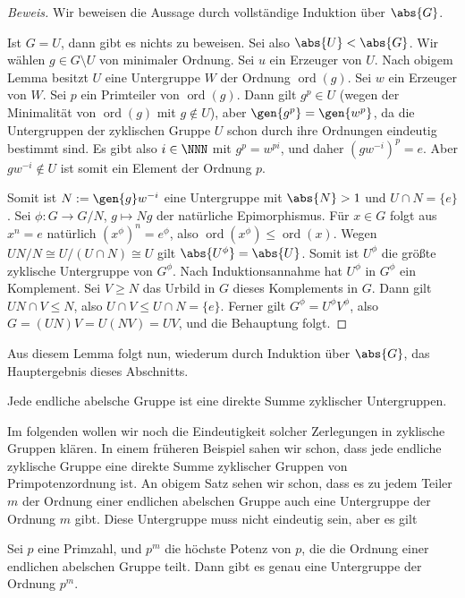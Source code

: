 \documentclass[12pt,a4paper,twoside]{article}
\DeclareMathOperator{\ord}{ord}
\begin{document}
\begin{proof}[Beweis]
  Wir beweisen die Aussage durch vollst\"andige Induktion \"uber $\abs{G}$.
  
  Ist $G=U$, dann gibt es nichts zu beweisen. Sei also $\abs{U}<\abs{G}$. Wir
  w\"ahlen $g\in G\setminus U$ von minimaler Ordnung. Sei $u$ ein Erzeuger von
  $U$. Nach obigem Lemma besitzt $U$ eine Untergruppe $W$ der Ordnung
  $\ord(g)$. Sei $w$ ein Erzeuger von $W$. Sei $p$ ein Primteiler von
  $\ord(g)$. Dann gilt $g^p\in U$ (wegen der Minimalit\"at von $\ord(g)$ mit
  $g\notin U$), aber $\gen{g^p}=\gen{w^p}$, da die Untergruppen der zyklischen
  Gruppe $U$ schon durch ihre Ordnungen eindeutig bestimmt sind. Es gibt also
  $i\in\NNN$ mit $g^p=w^{pi}$, und daher $(gw^{-i})^p=e$. Aber $gw^{-i}\notin
  U$ ist somit ein Element der Ordnung $p$.
  
  Somit ist $N:=\gen{g}w^{-i}$ eine Untergruppe mit $\abs{N}>1$ und $U\cap
  N=\{e\}$.  Sei $\phi:G\to G/N$, $g\mapsto Ng$ der nat\"urliche
  Epimorphismus. F\"ur $x\in G$ folgt aus $x^n=e$ nat\"urlich
  $(x^\phi)^n=e^\phi$, also $\ord(x^\phi)\le\ord(x)$. Wegen $UN/N\cong
  U/(U\cap N)\cong U$ gilt $\abs{U^\phi}=\abs{U}$. Somit ist $U^\phi$ die
  gr\"o\ss te zyklische Untergruppe von $G^\phi$. Nach Induktionsannahme hat
  $U^\phi$ in $G^\phi$ ein Komplement. Sei $V\ge N$ das Urbild in $G$ dieses
  Komplements in $G$.  Dann gilt $UN\cap V\le N$, also $U\cap V\le U\cap
  N=\{e\}$. Ferner gilt $G^\phi=U^\phi V^\phi$, also $G=(UN)V=U(NV)=UV$, und
  die Behauptung folgt.
\end{proof}
Aus diesem Lemma folgt nun, wiederum durch Induktion \"uber $\abs{G}$, das
Hauptergebnis dieses Abschnitts.
\begin{Satz}
  Jede endliche abelsche Gruppe ist eine direkte Summe zyklischer
  Untergruppen.
\end{Satz}
Im folgenden wollen wir noch die Eindeutigkeit solcher Zerlegungen in
zyklische Gruppen kl\"aren. In einem fr\"uheren Beispiel sahen wir schon, dass
jede endliche zyklische Gruppe eine direkte Summe zyklischer Gruppen von
Primpotenzordnung ist. An obigem Satz sehen wir schon, dass es zu jedem Teiler
$m$ der Ordnung einer endlichen abelschen Gruppe auch eine Untergruppe der
Ordnung $m$ gibt. Diese Untergruppe muss nicht eindeutig sein, aber es gilt
\begin{Lemma}
  Sei $p$ eine Primzahl, und $p^m$ die h\"ochste Potenz von $p$, die die
  Ordnung einer endlichen abelschen Gruppe teilt. Dann gibt es genau eine
  Untergruppe der Ordnung $p^m$.
\end{Lemma}
\end{document}
